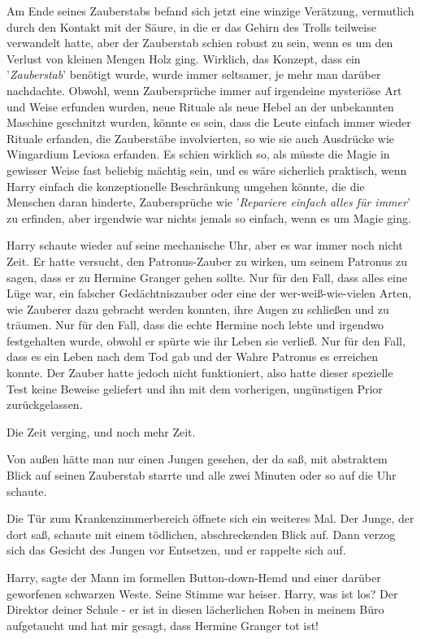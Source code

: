 Am Ende seines Zauberstabs befand sich jetzt eine winzige Verätzung, vermutlich
durch den Kontakt mit der Säure, in die er das Gehirn des Trolls teilweise
verwandelt hatte, aber der Zauberstab schien robust zu sein, wenn es um den
Verlust von kleinen Mengen Holz ging. Wirklich, das Konzept, dass ein
'\emph{Zauberstab}' benötigt wurde, wurde immer seltsamer, je mehr man darüber
nachdachte. Obwohl, wenn Zaubersprüche immer auf irgendeine mysteriöse Art und
Weise erfunden wurden, neue Rituale als neue Hebel an der unbekannten Maschine
geschnitzt wurden, könnte es sein, dass die Leute einfach immer wieder Rituale
erfanden, die Zauberstäbe involvierten, so wie sie auch Ausdrücke wie \glqq
Wingardium Leviosa\grqq{} erfanden. Es schien wirklich so, als müsste die Magie
in gewisser Weise fast beliebig mächtig sein, und es wäre sicherlich praktisch,
wenn Harry einfach die konzeptionelle Beschränkung umgehen könnte, die die
Menschen daran hinderte, Zaubersprüche wie '\emph{Repariere einfach alles für
immer}' zu erfinden, aber irgendwie war nichts jemals so einfach, wenn es um
Magie ging.

Harry schaute wieder auf seine mechanische Uhr, aber es war immer noch nicht
Zeit. Er hatte versucht, den Patronus-Zauber zu wirken, um seinem Patronus zu
sagen, dass er zu Hermine Granger gehen sollte. Nur für den Fall, dass alles
eine Lüge war, ein falscher Gedächtniszauber oder eine der wer-weiß-wie-vielen
Arten, wie Zauberer dazu gebracht werden konnten, ihre Augen zu schließen und zu
träumen. Nur für den Fall, dass die echte Hermine noch lebte und irgendwo
festgehalten wurde, obwohl er spürte wie ihr Leben sie verließ. Nur für den
Fall, dass es ein Leben nach dem Tod gab und der Wahre Patronus es erreichen
konnte. Der Zauber hatte jedoch nicht funktioniert, also hatte dieser spezielle
Test keine Beweise geliefert und ihn mit dem vorherigen, ungünstigen Prior
zurückgelassen.

Die Zeit verging, und noch mehr Zeit.

Von außen hätte man nur einen Jungen gesehen, der da saß, mit abstraktem Blick
auf seinen Zauberstab starrte und alle zwei Minuten oder so auf die Uhr schaute.

Die Tür zum Krankenzimmerbereich öffnete sich ein weiteres Mal. Der Junge, der
dort saß, schaute mit einem tödlichen, abschreckenden Blick auf. Dann verzog
sich das Gesicht des Jungen vor Entsetzen, und er rappelte sich auf.

\glqq Harry\grqq{}, sagte der Mann im formellen Button-down-Hemd und einer
darüber geworfenen schwarzen Weste. Seine Stimme war heiser. \glqq Harry, was
ist los? Der Direktor deiner Schule - er ist in diesen lächerlichen Roben in
meinem Büro aufgetaucht und hat mir gesagt, dass Hermine Granger tot ist!\grqq{}

